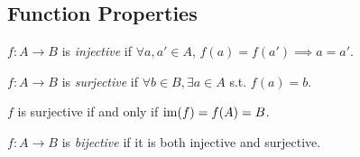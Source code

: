 \documentclass[../main.tex]{subfiles}
\begin{document}
\subsection{Function Properties}
\begin{definition}[Injective]
  $f:A \to B$ is \textit{injective} if $\forall a, a' \in A$, $f(a) = f(a') \implies a = a'$.
\end{definition}
\begin{definition}[Surjective]
  $f: A \to B$ is \textit{surjective} if $\forall b \in B, \exists a \in A$ s.t. $f(a) = b$.
\end{definition}
\begin{remark}
  $f$ is surjective if and only if $\operatorname{im}(f) = f(A) = B$.
\end{remark}
\begin{definition}[Bijective]
  $f: A \to B$ is \textit{bijective} if it is both injective and surjective.
\end{definition}
\end{document}
